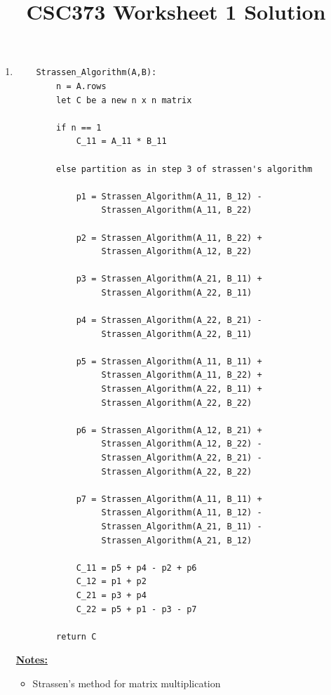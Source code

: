 \documentclass[12pt]{article}
\begin{document}
\title{CSC373 Worksheet 1 Solution}
\maketitle

\bigskip

\begin{enumerate}[1.]
    \item

    \begin{lstlisting}
    Strassen_Algorithm(A,B):
        n = A.rows
        let C be a new n x n matrix

        if n == 1
            C_11 = A_11 * B_11

        else partition as in step 3 of strassen's algorithm

            p1 = Strassen_Algorithm(A_11, B_12) -
                 Strassen_Algorithm(A_11, B_22)

            p2 = Strassen_Algorithm(A_11, B_22) +
                 Strassen_Algorithm(A_12, B_22)

            p3 = Strassen_Algorithm(A_21, B_11) +
                 Strassen_Algorithm(A_22, B_11)

            p4 = Strassen_Algorithm(A_22, B_21) -
                 Strassen_Algorithm(A_22, B_11)

            p5 = Strassen_Algorithm(A_11, B_11) +
                 Strassen_Algorithm(A_11, B_22) +
                 Strassen_Algorithm(A_22, B_11) +
                 Strassen_Algorithm(A_22, B_22)

            p6 = Strassen_Algorithm(A_12, B_21) +
                 Strassen_Algorithm(A_12, B_22) -
                 Strassen_Algorithm(A_22, B_21) -
                 Strassen_Algorithm(A_22, B_22)

            p7 = Strassen_Algorithm(A_11, B_11) +
                 Strassen_Algorithm(A_11, B_12) -
                 Strassen_Algorithm(A_21, B_11) -
                 Strassen_Algorithm(A_21, B_12)

            C_11 = p5 + p4 - p2 + p6
            C_12 = p1 + p2
            C_21 = p3 + p4
            C_22 = p5 + p1 - p3 - p7

        return C
    \end{lstlisting}

    \bigskip

    \underline{\textbf{Notes:}}

    \begin{itemize}
        \item Strassen's method for matrix multiplication


\end{itemize}
\end{enumerate}
\end{document}
